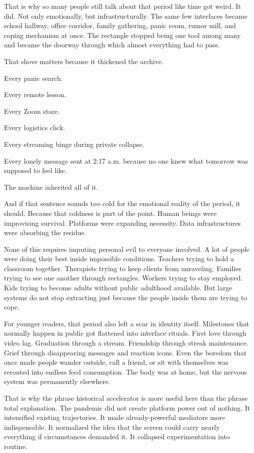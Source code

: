\documentclass[
  american,
  12pt,
  letterpaper,
]{article}
\begin{document}
That is why so many people still talk about that period like time got
weird. It did. Not only emotionally, but infrastructurally. The same few
interfaces became school hallway, office corridor, family gathering,
panic room, rumor mill, and coping mechanism at once. The rectangle
stopped being one tool among many and became the doorway through which
almost everything had to pass.

That shove matters because it thickened the archive.

Every panic search.

Every remote lesson.

Every Zoom stare.

Every logistics click.

Every streaming binge during private collapse.

Every lonely message sent at 2:17 a.m. because no one knew what tomorrow
was supposed to feel like.

The machine inherited all of it.

And if that sentence sounds too cold for the emotional reality of the
period, it should. Because that coldness is part of the point. Human
beings were improvising survival. Platforms were expanding necessity.
Data infrastructures were absorbing the residue.

None of this requires imputing personal evil to everyone involved. A lot
of people were doing their best inside impossible conditions. Teachers
trying to hold a classroom together. Therapists trying to keep clients
from unraveling. Families trying to see one another through rectangles.
Workers trying to stay employed. Kids trying to become adults without
public adulthood available. But large systems do not stop extracting
just because the people inside them are trying to cope.

For younger readers, that period also left a scar in identity itself.
Milestones that normally happen in public got flattened into interface
rituals. First love through video lag. Graduation through a stream.
Friendship through streak maintenance. Grief through disappearing
messages and reaction icons. Even the boredom that once made people
wander outside, call a friend, or sit with themselves was rerouted into
endless feed consumption. The body was at home, but the nervous system
was permanently elsewhere.

That is why the phrase historical accelerator is more useful here than
the phrase total explanation. The pandemic did not create platform power
out of nothing. It intensified existing trajectories. It made
already-powerful mediators more indispensable. It normalized the idea
that the screen could carry nearly everything if circumstances demanded
it. It collapsed experimentation into routine.
\end{document}
